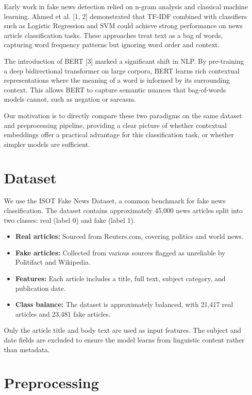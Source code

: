 \documentclass{article}
\begin{document}
Early work in fake news detection relied on n-gram analysis and classical machine learning. Ahmed et al. [1, 2] demonstrated that TF-IDF combined with classifiers such as Logistic Regression and SVM could achieve strong performance on news article classification tasks. These approaches treat text as a bag of words, capturing word frequency patterns but ignoring word order and context.

The introduction of BERT [3] marked a significant shift in NLP. By pre-training a deep bidirectional transformer on large corpora, BERT learns rich contextual representations where the meaning of a word is informed by its surrounding context. This allows BERT to capture semantic nuances that bag-of-words models cannot, such as negation or sarcasm.

Our motivation is to directly compare these two paradigms on the same dataset and preprocessing pipeline, providing a clear picture of whether contextual embeddings offer a practical advantage for this classification task, or whether simpler models are sufficient.

\section{Dataset}

We use the ISOT Fake News Dataset, a common benchmark for fake news classification. The dataset contains approximately 45,000 news articles split into two classes: real (label 0) and fake (label 1).

\begin{itemize}
    \item \textbf{Real articles:} Sourced from Reuters.com, covering politics and world news.
    \item \textbf{Fake articles:} Collected from various sources flagged as unreliable by Politifact and Wikipedia.
    \item \textbf{Features:} Each article includes a title, full text, subject category, and publication date.
    \item \textbf{Class balance:} The dataset is approximately balanced, with 21,417 real articles and 23,481 fake articles.
\end{itemize}

Only the article title and body text are used as input features. The subject and date fields are excluded to ensure the model learns from linguistic content rather than metadata.

\section{Preprocessing}
\end{document}
